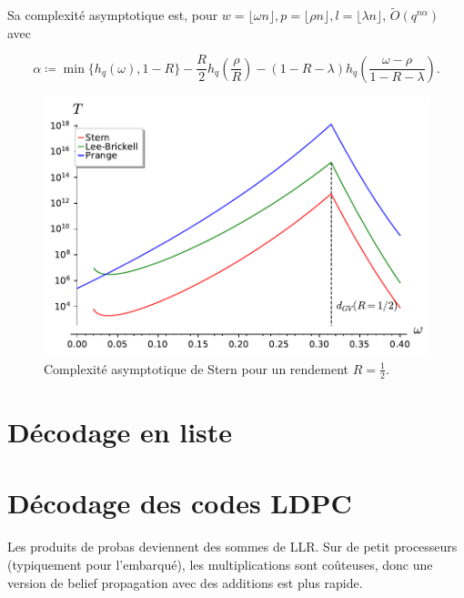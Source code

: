 \documentclass[a4paper,11pt,headings=small,footinclude=false]{scrartcl}
\theoremstyle{definition}
\theoremstyle{remark}
\begin{document}
Sa complexité asymptotique est, pour $w=\lfloor \omega n \rfloor, p = \lfloor \rho n \rfloor, l= \lfloor \lambda  n \rfloor$, $\tilde{O}(q^{n\alpha})$ avec

\[
	\alpha \coloneq \min\{ h_q(\omega), 1-R \} -\frac{R}{2} h_q(\frac{\rho}{R}) - (1-R-\lambda)h_q(\frac{\omega - \rho}{1 - R - \lambda}).
\]

\begin{figure}[h!]
\centering
\includegraphics{decodage_syndrome/Stern.pdf}
\caption{Complexité asymptotique de Stern pour un rendement $R=\frac{1}{2}$.}
\label{fig:prange}
\end{figure}

\newpage

\section{Décodage en liste}

\newpage
\section{Décodage des codes LDPC}

Les produits de probas deviennent des sommes de LLR. Sur de petit processeurs (typiquement pour l'embarqué), les multiplications sont coûteuses, donc une version de belief propagation avec des additions est plus rapide.
\end{document}
